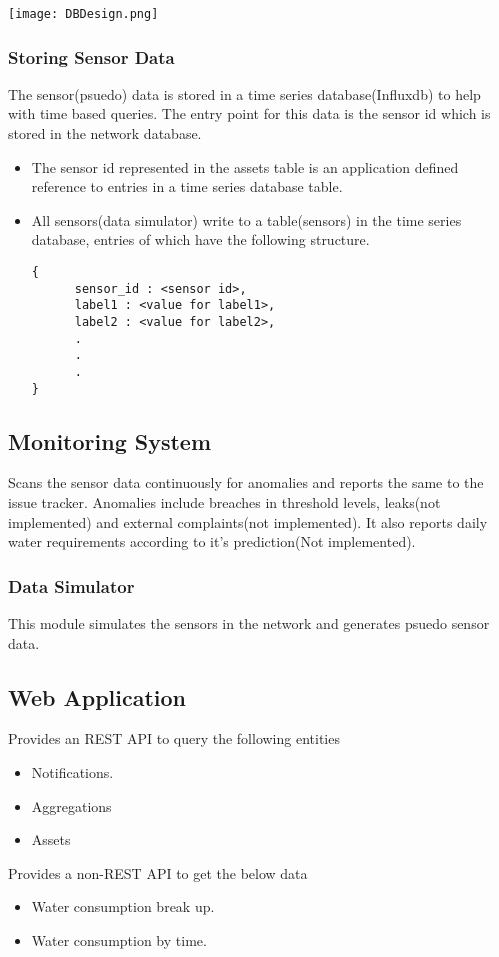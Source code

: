 \documentclass[11pt]{report} %
\begin{document}
\texttt{[image: DBDesign.png]}
\subsubsection{Storing Sensor Data}
The sensor(psuedo) data is stored in a time series database(Influxdb) to help with time based queries. The entry point for this data is the sensor id which is stored in the network database.
\begin{itemize}
\item The sensor id represented in the assets table is an application defined reference to entries in a time series database table.
\item All sensors(data simulator) write to a table(sensors) in the time series database,  entries of which have the following structure.
\begin{lstlisting}
{
      sensor_id : <sensor id>,
      label1 : <value for label1>,
      label2 : <value for label2>,
      .
      .
      .
}
\end{lstlisting}
\end{itemize}
\subsection{Monitoring System}
Scans the sensor data continuously for anomalies and reports the same to the issue tracker. Anomalies include breaches in threshold levels, leaks(not implemented) and external complaints(not implemented). It also reports daily water requirements according to it's prediction(Not implemented).
\subsubsection{Data Simulator}
This module simulates the sensors in the network and generates psuedo sensor data.
\subsection{Web Application}
Provides an REST API to query  the following entities
\begin{itemize}
\item Notifications.
\item Aggregations
\item Assets
\end{itemize}
Provides a non-REST API to get the below data
\begin{itemize}
\item Water consumption break up.
\item Water consumption by time.
\end{itemize}
\end{document}
